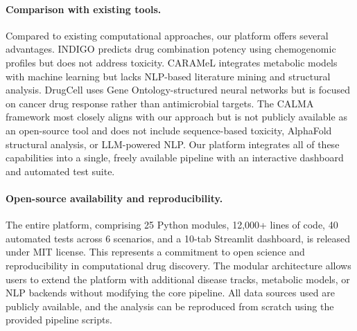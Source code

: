 \documentclass[12pt,a4paper]{article}
\begin{document}
\paragraph{Comparison with existing tools.}
Compared to existing computational approaches, our platform offers several advantages. INDIGO \citep{chandrasekaran2016} predicts drug combination potency using chemogenomic profiles but does not address toxicity. CARAMeL \citep{ji2023} integrates metabolic models with machine learning but lacks NLP-based literature mining and structural analysis. DrugCell \citep{kuenzi2020} uses Gene Ontology-structured neural networks but is focused on cancer drug response rather than antimicrobial targets. The CALMA framework \citep{arora2026} most closely aligns with our approach but is not publicly available as an open-source tool and does not include sequence-based toxicity, AlphaFold structural analysis, or LLM-powered NLP. Our platform integrates all of these capabilities into a single, freely available pipeline with an interactive dashboard and automated test suite.

\paragraph{Open-source availability and reproducibility.}
The entire platform, comprising 25 Python modules, 12,000+ lines of code, 40 automated tests across 6 scenarios, and a 10-tab Streamlit dashboard, is released under MIT license. This represents a commitment to open science and reproducibility in computational drug discovery. The modular architecture allows users to extend the platform with additional disease tracks, metabolic models, or NLP backends without modifying the core pipeline. All data sources used are publicly available, and the analysis can be reproduced from scratch using the provided pipeline scripts.
\end{document}
